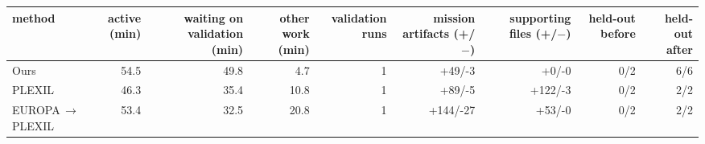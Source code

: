 \begin{tabular}{lrrrrrrrr}
\toprule
method & active (min) & waiting on validation (min) & other work (min) & validation runs & mission artifacts (+/$-$) & supporting files (+/$-$) & held-out before & held-out after \\
\midrule
Ours & 54.5 & 49.8 & 4.7 & 1 & +49/-3 & +0/-0 & 0/2 & 6/6 \\
PLEXIL & 46.3 & 35.4 & 10.8 & 1 & +89/-5 & +122/-3 & 0/2 & 2/2 \\
EUROPA\,$\rightarrow$\,PLEXIL & 53.4 & 32.5 & 20.8 & 1 & +144/-27 & +53/-0 & 0/2 & 2/2 \\
\bottomrule
\end{tabular}
